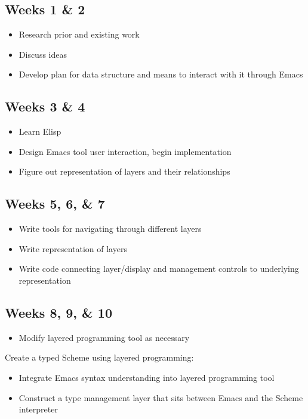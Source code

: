 \documentclass[12pt]{article}
\begin{document}
\subsection*{Weeks 1 \& 2}
\label{sec:orgheadline4}
\begin{itemize}
\item Research prior and existing work
\item Discuss ideas
\item Develop plan for data structure and means to interact with it through Emacs
\end{itemize}
\subsection*{Weeks 3 \& 4}
\label{sec:orgheadline5}
\begin{itemize}
\item Learn Elisp
\item Design Emacs tool user interaction, begin implementation
\item Figure out representation of layers and their relationships
\end{itemize}
\subsection*{Weeks 5, 6, \& 7}
\label{sec:orgheadline6}
\begin{itemize}
\item Write tools for navigating through different layers
\item Write representation of layers
\item Write code connecting layer/display and management controls to underlying representation
\end{itemize}
\subsection*{Weeks 8, 9, \& 10}
\label{sec:orgheadline7}
\begin{itemize}
\item Modify layered programming tool as necessary
\end{itemize}
Create a typed Scheme using layered programming:
\begin{itemize}
\item Integrate Emacs syntax understanding into layered programming tool
\item Construct a type management layer that sits between Emacs and the Scheme interpreter
\end{itemize}
\end{document}
